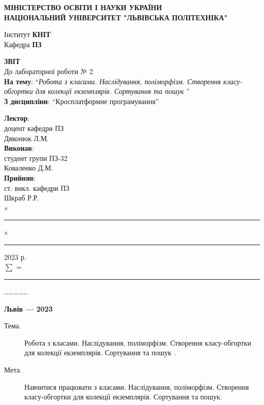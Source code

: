 \documentclass[14pt]{extreport}
\newcommand\subject{Кросплатформне програмування}
\newcommand\lecturer{доцент кафедри ПЗ\\Дяконюк Л.М.}
\newcommand\teacher{ст. викл. кафедри ПЗ\\Шкраб Р.Р.}
\newcommand\mygroup{ПЗ-32}
\newcommand\lab{2}
\newcommand\theme{Робота з класами. Наслідування,
	поліморфізм. Створення класу-обгортки для
	колекції екземплярів. Сортування та пошук
}
\newcommand\purpose{Навчитися працювати з класами. Наслідування,
	поліморфізм. Створення класу-обгортки для
	колекції екземплярів. Сортування та пошук}
\begin{document}
\begin{normalsize}
	\begin{titlepage}
		\thispagestyle{empty}
		\begin{center}
			\textbf{МІНІСТЕРСТВО ОСВІТИ І НАУКИ УКРАЇНИ\\
				НАЦІОНАЛЬНИЙ УНІВЕРСИТЕТ "ЛЬВІВСЬКА ПОЛІТЕХНІКА"}
		\end{center}
		\begin{flushright}
			Інститут \textbf{КНІТ}\\
			Кафедра \textbf{ПЗ}
		\end{flushright}
		\vspace{160pt}
		\begin{center}
			\textbf{ЗВІТ}\\
			\vspace{10pt}
			До лабораторної роботи № \lab\\
			\textbf{На тему}: “\textit{\theme}”\\
			\textbf{З дисципліни}: “\subject”
		\end{center}
		\vspace{40pt}
		\begin{flushright}
			
			\textbf{Лектор}:\\
			\lecturer\\
			\vspace{10pt}
			\textbf{Виконав}:\\
			
			студент групи \mygroup\\
			Коваленко Д.М.\\
			\vspace{10pt}
			\textbf{Прийняв}:\\
			
			\teacher\\
			
			\vspace{28pt}
			«\rule{1cm}{0.15mm}» \rule{1.5cm}{0.15mm} 2023 р.\\
			$\sum$ = \rule{1cm}{0.15mm}……………\\
			
		\end{flushright}
		\vspace{\fill}
		\begin{center}
			\textbf{Львів — 2023}
		\end{center}
	\end{titlepage}
		
	\begin{description}
		\item[Тема.] \theme.
		\item[Мета.] \purpose.
	\end{description}
	

\end{normalsize}
\end{document}
